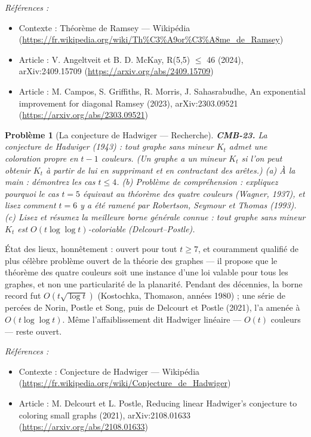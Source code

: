 \documentclass[11pt]{article}
\newtheorem{problem}{Problème}
\newenvironment{refs}{\par\small\noindent\emph{Références :}\begin{itemize}\setlength\itemsep{0pt}}{\end{itemize}\normalsize}
\begin{document}
\begin{refs}
\item Contexte : Théorème de Ramsey --- Wikipédia (\url{https://fr.wikipedia.org/wiki/Th%C3%A9or%C3%A8me_de_Ramsey})
\item Article : V. Angeltveit et B. D. McKay, \og{} R(5,5) $\le$ 46 \fg{} (2024), arXiv:2409.15709 (\url{https://arxiv.org/abs/2409.15709})
\item Article : M. Campos, S. Griffiths, R. Morris, J. Sahasrabudhe, \og{} An exponential improvement for diagonal Ramsey \fg{} (2023), arXiv:2303.09521 (\url{https://arxiv.org/abs/2303.09521})
\end{refs}

\bigskip

\begin{problem}[{La conjecture de Hadwiger --- Recherche}]
\textbf{CMB-23.} La conjecture de Hadwiger (1943) : tout graphe sans mineur
$ K_t $ admet une coloration propre en $ t - 1 $ couleurs. (Un graphe a un mineur $ K_t $ si
l'on peut obtenir $ K_t $ à partir de lui en supprimant et en contractant des arêtes.) (a) À la
main : démontrez les cas $ t \le 4 $. (b) Problème de compréhension : expliquez pourquoi le cas
$ t = 5 $ équivaut au théorème des quatre couleurs (Wagner, 1937), et lisez comment
$ t = 6 $ y a été ramené par Robertson, Seymour et Thomas (1993). (c) Lisez et résumez la
meilleure borne générale connue : tout graphe sans mineur $ K_t $ est
$ O(t \log\log t) $-coloriable (Delcourt--Postle).
\end{problem}

\noindent État des lieux, honnêtement : ouvert pour tout $ t \ge 7 $, et couramment
qualifié de plus célèbre problème ouvert de la théorie des graphes --- il propose que le théorème
des quatre couleurs soit une instance d'une loi valable pour tous les graphes, et non une
particularité de la planarité. Pendant des décennies, la borne record fut
$ O(t\sqrt{\log t}) $ (Kostochka, Thomason, années 1980) ; une série de percées de Norin, Postle
et Song, puis de Delcourt et Postle (2021), l'a amenée à $ O(t \log\log t) $. Même
l'affaiblissement dit \og{} Hadwiger linéaire \fg{} --- $ O(t) $ couleurs --- reste ouvert.

\begin{refs}
\item Contexte : Conjecture de Hadwiger --- Wikipédia (\url{https://fr.wikipedia.org/wiki/Conjecture_de_Hadwiger})
\item Article : M. Delcourt et L. Postle, \og{} Reducing linear Hadwiger's conjecture to coloring small graphs \fg{} (2021), arXiv:2108.01633 (\url{https://arxiv.org/abs/2108.01633})
\end{refs}
\end{document}
